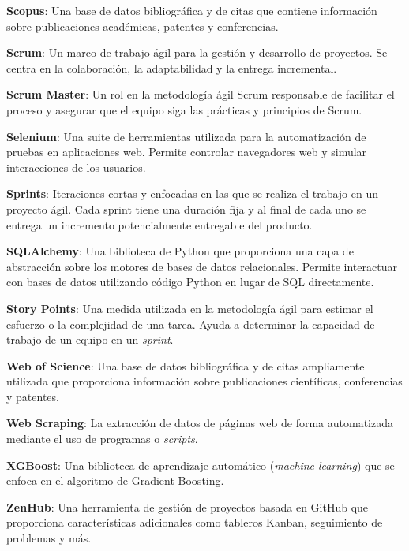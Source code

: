 \textbf{Scopus}: Una base de datos bibliográfica y de citas que contiene información sobre publicaciones académicas, patentes y conferencias.

\textbf{Scrum}: Un marco de trabajo ágil para la gestión y desarrollo de proyectos. Se centra en la colaboración, la adaptabilidad y la entrega incremental.

\textbf{Scrum Master}: Un rol en la metodología ágil Scrum responsable de facilitar el proceso y asegurar que el equipo siga las prácticas y principios de Scrum.

\textbf{Selenium}: Una suite de herramientas utilizada para la automatización de pruebas en aplicaciones web. Permite controlar navegadores web y simular interacciones de los usuarios.

\textbf{Sprints}: Iteraciones cortas y enfocadas en las que se realiza el trabajo en un proyecto ágil. Cada sprint tiene una duración fija y al final de cada uno se entrega un incremento potencialmente entregable del producto.

\textbf{SQLAlchemy}: Una biblioteca de Python que proporciona una capa de abstracción sobre los motores de bases de datos relacionales. Permite interactuar con bases de datos utilizando código Python en lugar de SQL directamente.

\textbf{Story Points}: Una medida utilizada en la metodología ágil para estimar el esfuerzo o la complejidad de una tarea. Ayuda a determinar la capacidad de trabajo de un equipo en un \textit{sprint}.

\textbf{Web of Science}: Una base de datos bibliográfica y de citas ampliamente utilizada que proporciona información sobre publicaciones científicas, conferencias y patentes.

\textbf{Web Scraping}: La extracción de datos de páginas web de forma automatizada mediante el uso de programas o \textit{scripts}.

\textbf{XGBoost}: Una biblioteca de aprendizaje automático (\textit{machine learning}) que se enfoca en el algoritmo de Gradient Boosting.

\textbf{ZenHub}: Una herramienta de gestión de proyectos basada en GitHub que proporciona características adicionales como tableros Kanban, seguimiento de problemas y más.